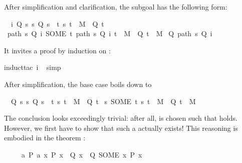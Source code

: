 \begin{isabellebody}
\begin{isamarkuptxt}
\noindent
After simplification and clarification, the subgoal has the following form:
\begin{isabelle}%
\ {}{\isachardot}\ {\isasymAnd}i{\isachardot}\ {\isasymlbrakk}Q\ s{\isacharsemicolon}\ {\isasymforall}s{\isachardot}\ Q\ s\ {\isasymlongrightarrow}\ {\isacharparenleft}{\isasymexists}t{\isachardot}\ {\isacharparenleft}s{\isacharcomma}\ t{\isacharparenright}\ {\isasymin}\ M\ {\isasymand}\ Q\ t{\isacharparenright}{\isasymrbrakk}\isanewline
{}\ {\isacharparenleft}path\ s\ Q\ i{\isacharcomma}\ SOME\ t{\isachardot}\ {\isacharparenleft}path\ s\ Q\ i{\isacharcomma}\ t{\isacharparenright}\ {\isasymin}\ M\ {\isasymand}\ Q\ t{\isacharparenright}\ {\isasymin}\ M\ {\isasymand}\isanewline
{}Q\ {\isacharparenleft}path\ s\ Q\ i{\isacharparenright}%
\end{isabelle}
It invites a proof by induction on :%
\end{isamarkuptxt}%
\isamarkuptrue%
induct{\isacharunderscore}tac\ i{\isacharparenright}\isanewline
\ \isamarkupfalse%
simp{\isacharparenright}\isamarkupfalse%
%
\begin{isamarkuptxt}%
\noindent
After simplification, the base case boils down to
\begin{isabelle}%
\ {}{\isachardot}\ {\isasymlbrakk}Q\ s{\isacharsemicolon}\ {\isasymforall}s{\isachardot}\ Q\ s\ {\isasymlongrightarrow}\ {\isacharparenleft}{\isasymexists}t{\isachardot}\ {\isacharparenleft}s{\isacharcomma}\ t{\isacharparenright}\ {\isasymin}\ M\ {\isasymand}\ Q\ t{\isacharparenright}{\isasymrbrakk}\isanewline
{}\ {\isacharparenleft}s{\isacharcomma}\ SOME\ t{\isachardot}\ {\isacharparenleft}s{\isacharcomma}\ t{\isacharparenright}\ {\isasymin}\ M\ {\isasymand}\ Q\ t{\isacharparenright}\ {\isasymin}\ M%
\end{isabelle}
The conclusion looks exceedingly trivial: after all,  is chosen such that 
holds. However, we first have to show that such a  actually exists! This reasoning
is embodied in the theorem :
\begin{isabelle}%
\ \ \ \ \ {\isasymlbrakk}{\isasymexists}a{\isachardot}\ {\isacharquery}P\ a{\isacharsemicolon}\ {\isasymAnd}x{\isachardot}\ {\isacharquery}P\ x\ {\isasymLongrightarrow}\ {\isacharquery}Q\ x{\isasymrbrakk}\ {\isasymLongrightarrow}\ {\isacharquery}Q\ {\isacharparenleft}SOME\ x{\isachardot}\ {\isacharquery}P\ x{\isacharparenright}%

\end{isabelle}
\end{isamarkuptxt}
\end{isabellebody}
